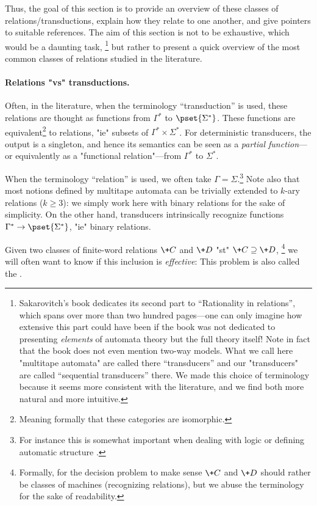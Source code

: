 Thus, the goal of this section is to provide an overview of these classes of relations/transductions, explain how they relate to one another, and give pointers to suitable references.
The aim of this section is not to be exhaustive, which would be a daunting task,%
\footnote{Sakarovitch's book \cite{Sakarovitch2009Elements}
dedicates its second part to ``Rationality in relations'', which spans over more than two hundred pages---one can only imagine how extensive this part could have been if the book was not
dedicated to presenting \emph{elements} of automata theory but the full theory itself!
Note in fact that the book does not even mention two-way models.
What we call here "multitape automata" are called there ``transducers''
and our "transducers" are called ``sequential transducers'' there.
We made this choice of terminology because it seems more consistent with
the literature, and we find both more natural and more intuitive.}
but rather to present a quick overview of the most common classes of relations
studied in the literature.

\paragraph*{Relations "vs" transductions.}
Often, in the literature, when the terminology ``transduction'' is used,
these relations are thought as functions from $\Gamma^*$ to $\pset{\Sigma^*}$.
These functions are equivalent\footnote{Meaning formally that these categories are isomorphic.}
to relations, "ie" subsets of $\Gamma^* \times \Sigma^*$.
For deterministic transducers, the output is a singleton, and hence its semantics can be seen
as a \emph{partial function}---or equivalently as a "functional relation"---from $\Gamma^*$ to $\Sigma^*$.

When the terminology ``relation'' is used,
we often take $\Gamma = \Sigma$.\footnote{For instance this is somewhat important when
dealing with logic or defining automatic structure
.}
Note also that most notions defined by multitape automata
can be trivially extended to $k$-ary relations ($k \geq 3$):
we simply work here with binary relations for the sake of simplicity.
On the other hand, transducers intrinsically recognize functions $\Gamma^* \to \pset{\Sigma^*}$,
"ie" binary relations.

Given two classes of finite-word relations $\+C$ and $\+D$ "st" $\+C \supseteq \+D$,%
\footnote{Formally, for the decision problem to make sense $\+C$ and $\+D$ should rather be
classes of machines (recognizing relations),
but we abuse the terminology for the sake of readability.}
we will often want to know if this inclusion is \emph{effective}:
This problem is also called the .

